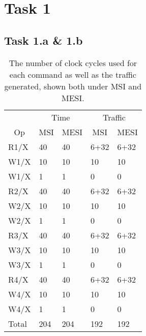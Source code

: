 \section{Task 1}
\subsection{Task 1.a \& 1.b}

\begin{table}[]
\centering
\begin{tabular}{l|ll|ll}
                        & \multicolumn{2}{c|}{Time}                           & \multicolumn{2}{c|}{Traffic}                       \\
\multicolumn{1}{c|}{Op} & \multicolumn{1}{c}{MSI} & \multicolumn{1}{c|}{MESI} & \multicolumn{1}{c}{MSI} & \multicolumn{1}{c}{MESI} \\ \hline
R1/X                    & 40                      & 40                        & 6+32                    & 6+32                     \\
W1/X                    & 10                      & 10                        & 10                      & 10                       \\
W1/X                    & 1                       & 1                         & 0                       & 0                        \\
R2/X                    & 40                      & 40                        & 6+32                    & 6+32                     \\
W2/X                    & 10                      & 10                        & 10                      & 10                       \\
W2/X                    & 1                       & 1                         & 0                       & 0                        \\
R3/X                    & 40                      & 40                        & 6+32                    & 6+32                     \\
W3/X                    & 10                      & 10                        & 10                      & 10                       \\
W3/X                    & 1                       & 1                         & 0                       & 0                        \\
R4/X                    & 40                      & 40                        & 6+32                    & 6+32                     \\
W4/X                    & 10                      & 10                        & 10                      & 10                       \\
W4/X                    & 1                       & 1                         & 0                       & 0                        \\ \hline
Total                   & 204                     & 204                       & 192                     & 192
\end{tabular}
\caption{The number of clock cycles used for each command as well as the traffic generated, shown both under MSI and MESI.}
\label{tab:t1ab}
\end{table}
